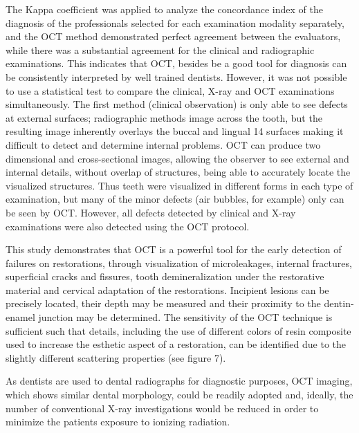 \documentclass[12pt,twoside,english]{book}
\renewcommand{\~}{\perispomeni}%
\numberwithin{equation}{section}
\numberwithin{figure}{section}
\begin{document}
The Kappa coefficient was applied to analyze the concordance index of the diagnosis of the professionals selected for each examination modality separately, and the OCT method demonstrated perfect agreement between the evaluators, while there was a substantial agreement for the clinical and radiographic examinations. This indicates that OCT, besides be a good tool for diagnosis can be consistently interpreted by well trained dentists. However, it was not possible to use a statistical test to compare the clinical, X-ray and OCT examinations simultaneously. The first method (clinical observation) is only able to see defects at external surfaces; radiographic methods image across the tooth, but the resulting image inherently overlays the buccal and lingual 14 surfaces making it difficult to detect and determine internal problems. OCT can produce two dimensional and cross-sectional images, allowing the observer to see external and internal details, without overlap of structures, being able to accurately locate the visualized structures. Thus teeth were visualized in different forms in each type of examination, but many of the minor defects (air bubbles, for example) only can be seen by OCT. However, all defects detected by clinical and X-ray examinations were also detected using the OCT protocol.

This study demonstrates that OCT is a powerful tool for the early detection of failures on restorations, through visualization of microleakages, internal fractures, superficial cracks and fissures, tooth demineralization under the restorative material and cervical adaptation of the restorations. Incipient lesions can be precisely located, their depth may be measured and their proximity to the dentin-enamel junction may be determined. The sensitivity of the OCT technique is sufficient such that details, including the use of different colors of resin composite used to increase the esthetic aspect of a restoration, can be identified due to the slightly different scattering properties (see figure 7).

As dentists are used to dental radiographs for diagnostic purposes, OCT imaging, which shows similar dental morphology, could be readily adopted\cite{ChooSmith:2008p1834} and, ideally, the number of conventional X-ray investigations would be reduced in order to minimize the patients exposure to ionizing radiation\cite{Brandenburg:2003p2055}.
\end{document}
